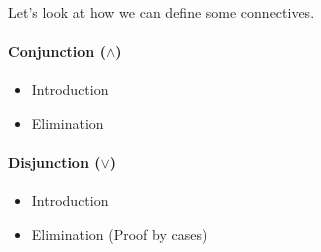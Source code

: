 Let's look at how we can define some connectives.
\paragraph{Conjunction ($\land$)}
\begin{itemize}
  \item Introduction
        \begin{prooftree}
        \end{prooftree}
  \item Elimination
        \noindent
        \begin{minipage}[t]{0.5\textwidth}
          \begin{prooftree}
          \end{prooftree}
        \end{minipage}\hfill
        \begin{minipage}[t]{0.5\textwidth}
          \begin{prooftree}
          \end{prooftree}
        \end{minipage}
\end{itemize}
\paragraph{Disjunction ($\lor$)}
\begin{itemize}
  \item Introduction
        \begin{minipage}[t]{0.5\textwidth}
          \begin{prooftree}
          \end{prooftree}
        \end{minipage}\hfill
        \begin{minipage}[t]{0.5\textwidth}
          \begin{prooftree}
          \end{prooftree}
        \end{minipage}
  \item Elimination (Proof by cases)
        \begin{prooftree}
        \end{prooftree}
\end{itemize}

